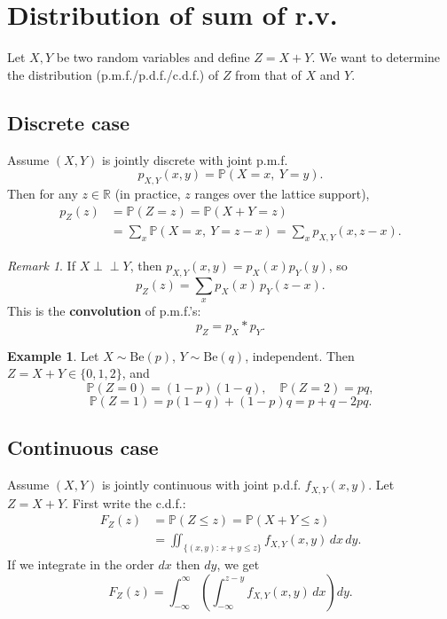 \documentclass[11pt]{article}
\theoremstyle{plain}
\theoremstyle{definition}
\newtheorem{example}[theorem]{Example}
\theoremstyle{remark}
\newtheorem{remark}[theorem]{Remark}
\begin{document}
	
	
	\section{Distribution of sum of r.v.}
	
	Let \(X,Y\) be two random variables and define \(Z=X+Y\).
	We want to determine the distribution (p.m.f./p.d.f./c.d.f.) of \(Z\) from that of \(X\) and \(Y\).
	
	\subsection{Discrete case}
	
	Assume \((X,Y)\) is jointly discrete with joint p.m.f.
	\[
	p_{X,Y}(x,y)=\mathbb{P}(X=x,\ Y=y).
	\]
	Then for any \(z\in\mathbb{R}\) (in practice, \(z\) ranges over the lattice support),
	\begin{align*}
		p_Z(z)
		&=\mathbb{P}(Z=z)
		=\mathbb{P}(X+Y=z) \\
		&=\sum_{x}\mathbb{P}(X=x,\ Y=z-x)
		=\sum_x p_{X,Y}(x,z-x).
	\end{align*}
	
	\begin{remark}
		If \(X\perp\!\!\!\perp Y\), then \(p_{X,Y}(x,y)=p_X(x)p_Y(y)\), so
		\[
		p_Z(z)=\sum_x p_X(x)\,p_Y(z-x).
		\]
		This is the \textbf{convolution} of p.m.f.'s:
		\[
		p_Z=p_X * p_Y.
		\]
	\end{remark}
	
	\begin{example}
		Let \(X\sim \mathrm{Be}(p)\), \(Y\sim \mathrm{Be}(q)\), independent.
		Then \(Z=X+Y\in\{0,1,2\}\), and
		\[
		\mathbb{P}(Z=0)=(1-p)(1-q),\quad
		\mathbb{P}(Z=2)=pq,
		\]
		\[
		\mathbb{P}(Z=1)=p(1-q)+(1-p)q=p+q-2pq.
		\]
	\end{example}
	
	\subsection{Continuous case}
	
	Assume \((X,Y)\) is jointly continuous with joint p.d.f. \(f_{X,Y}(x,y)\).
	Let \(Z=X+Y\). First write the c.d.f.:
	\begin{align*}
		F_Z(z)
		&=\mathbb{P}(Z\le z)
		=\mathbb{P}(X+Y\le z)\\
		&=\iint_{\{(x,y):\,x+y\le z\}} f_{X,Y}(x,y)\,dx\,dy.
	\end{align*}
	If we integrate in the order \(dx\) then \(dy\), we get
	\[
	F_Z(z)=\int_{-\infty}^{\infty}\left(\int_{-\infty}^{z-y} f_{X,Y}(x,y)\,dx\right)dy.
	\]
	
\end{document}
